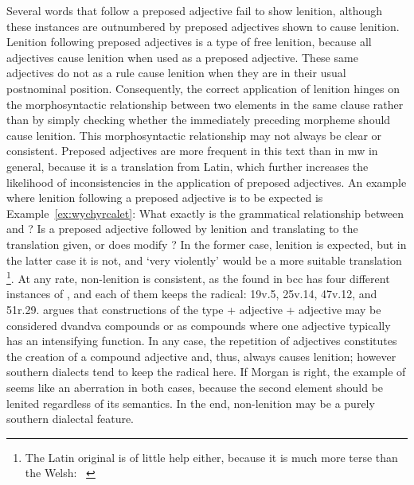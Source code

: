 Several words that follow a preposed adjective fail to show lenition, although these instances are outnumbered by preposed adjectives shown to cause lenition.
Lenition following preposed adjectives is a type of free lenition, because all adjectives cause lenition when used as a preposed adjective.
These same adjectives do not as a rule cause lenition when they are in their usual postnominal position.
Consequently, the correct application of lenition hinges on the morphosyntactic relationship between two elements in the same clause rather than by simply checking whether the immediately preceding morpheme should cause lenition.
This morphosyntactic relationship may not always be clear or consistent.
Preposed adjectives are more frequent in this text than in \gls{mw} in general, because it is a translation from Latin, which further increases the likelihood of inconsistencies in the application of preposed adjectives.
An example where lenition following a  preposed adjective is to be expected is Example~\ref{ex:wychyrcalet}:
What exactly is the grammatical relationship between  and ?
Is  a preposed adjective followed by lenition and translating to the translation given, or does  modify ? In the former case, lenition is expected, but in the latter case it is not, and `very violently' would be a more suitable translation%
\footnote{The Latin original is of little help either, because it is much more terse than the Welsh: ~\autocite[42--43]{Geo_History09}}.
At any rate, non-lenition is consistent, as the  found in \gls{bcc} has four different instances of , and each of them keeps the radical: 19v.5, 25v.14, 47v.12, and 51r.29.
\Textcite[31--32]{morgan_y_1952} argues that constructions of the type   + adjective + adjective  may be considered dvandva compounds or as compounds where one adjective typically has an intensifying function.
In any case, the repetition of adjectives constitutes the creation of a compound adjective and, thus, always causes lenition; however southern dialects tend to keep the radical here.
If Morgan is right, the example of   seems like an aberration in both cases, because the second element should be lenited regardless of its semantics.
In the end, non-lenition may be a purely southern dialectal feature.

